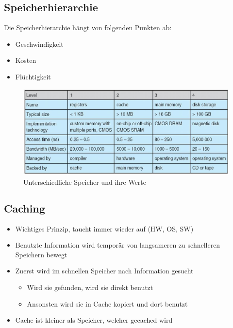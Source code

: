 \documentclass[a4paper]{scrreprt}
\begin{document}
\subsection{Speicherhierarchie}
Die Speicherhierarchie hängt von folgenden Punkten ab:
\begin{itemize}
	\item Geschwindigkeit
	\item Kosten
	\item Flüchtigkeit
\end{itemize}

\begin{figure}[ht]
\centering
\includegraphics[scale=0.4]{graphics/storage.png}
\caption{Unterschiedliche Speicher und ihre Werte}
\end{figure}

\subsection{Caching}
\begin{itemize}
	\item Wichtiges Prinzip, taucht immer wieder auf (HW, OS, SW)
	\item Benutzte Information wird temporär von langsameren zu schnelleren Speichern bewegt
	\item Zuerst wird im schnellen Speicher nach Information gesucht
		\begin{itemize}
			\item Wird sie gefunden, wird sie direkt benutzt
			\item Ansonsten wird sie in Cache kopiert und dort benutzt
		\end{itemize}
	\item Cache ist kleiner als Speicher, welcher gecached wird
\end{itemize}
\end{document}
